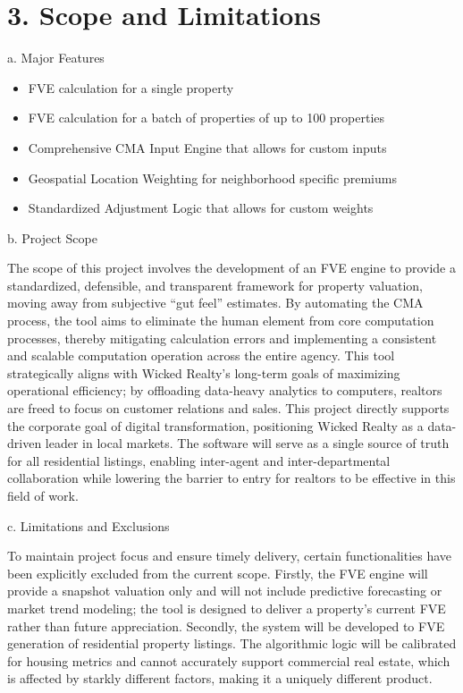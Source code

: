 \hypertarget{scope-and-limitations}{%
\section{3. Scope and Limitations}\label{scope-and-limitations}}

a. Major Features

\begin{itemize}
\item
  FVE calculation for a single property
\item
  FVE calculation for a batch of properties of up to 100 properties
\item
  Comprehensive CMA Input Engine that allows for custom inputs
\item
  Geospatial Location Weighting for neighborhood specific premiums
\item
  Standardized Adjustment Logic that allows for custom weights
\end{itemize}

b. Project Scope

The scope of this project involves the development of an FVE engine to
provide a standardized, defensible, and transparent framework for
property valuation, moving away from subjective ``gut feel'' estimates.
By automating the CMA process, the tool aims to eliminate the human
element from core computation processes, thereby mitigating calculation
errors and implementing a consistent and scalable computation operation
across the entire agency. This tool strategically aligns with Wicked
Realty's long-term goals of maximizing operational efficiency; by
offloading data-heavy analytics to computers, realtors are freed to
focus on customer relations and sales. This project directly supports
the corporate goal of digital transformation, positioning Wicked Realty
as a data-driven leader in local markets. The software will serve as a
single source of truth for all residential listings, enabling
inter-agent and inter-departmental collaboration while lowering the
barrier to entry for realtors to be effective in this field of work.

c. Limitations and Exclusions

To maintain project focus and ensure timely delivery, certain
functionalities have been explicitly excluded from the current scope.
Firstly, the FVE engine will provide a snapshot valuation only and will
not include predictive forecasting or market trend modeling; the tool is
designed to deliver a property's current FVE rather than future
appreciation. Secondly, the system will be developed to FVE generation
of residential property listings. The algorithmic logic will be
calibrated for housing metrics and cannot accurately support commercial
real estate, which is affected by starkly different factors, making it a
uniquely different product.

